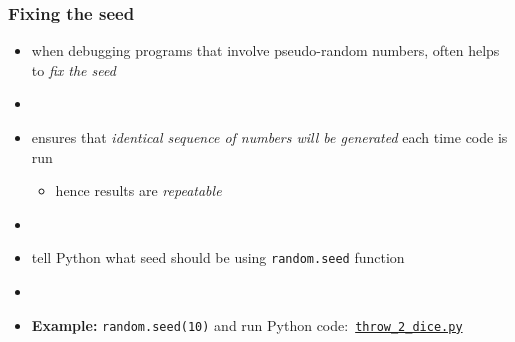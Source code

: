 \documentclass[14pt]{beamer}
\newcommand\red[1]{{\color{red} #1}}
\begin{document}

\begin{frame}[fragile]

\frametitle{Fixing the seed}

\begin{itemize}
	\item when debugging programs that involve pseudo-random numbers, often helps to \red{\emph{fix the seed}}
	\item[]
	\item ensures that \emph{identical sequence of numbers will be generated} each time code is run
	\begin{itemize}
		\item hence results are \emph{repeatable}
	\end{itemize}
	\item[]
	\item tell Python what seed should be using \texttt{random.seed} function
	\item[]
	\item \textbf{Example:} \texttt{random.seed(10)} and run Python code:~\href{https://github.com/slgit/prog4comp_2/blob/master/py36-src/throw_2_dice.py}{\texttt{throw\_2\_dice.py}}
\end{itemize}

\end{frame}

\end{document}
